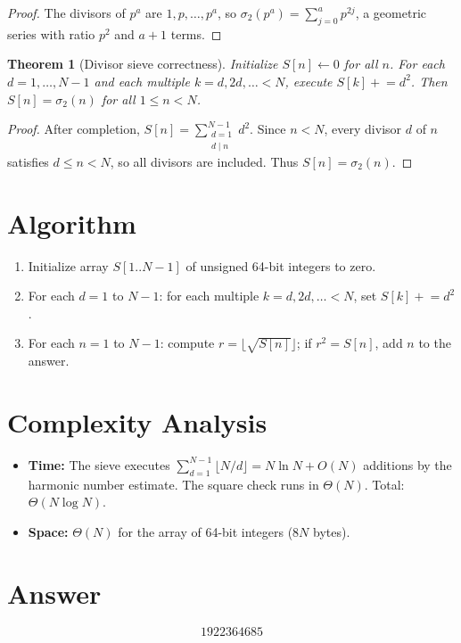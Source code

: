 \documentclass[12pt]{article}
\newtheorem{theorem}{Theorem}
\theoremstyle{definition}
\begin{document}
\begin{proof}
The divisors of $p^a$ are $1, p, \ldots, p^a$, so $\sigma_2(p^a) = \sum_{j=0}^{a} p^{2j}$, a geometric series with ratio $p^2$ and $a+1$ terms.
\end{proof}

\begin{theorem}[Divisor sieve correctness]
Initialize $S[n] \leftarrow 0$ for all $n$. For each $d = 1, \ldots, N{-}1$ and each multiple $k = d, 2d, \ldots < N$, execute $S[k] \mathrel{+}= d^2$. Then $S[n] = \sigma_2(n)$ for all $1 \leq n < N$.
\end{theorem}

\begin{proof}
After completion, $S[n] = \sum_{\substack{d=1 \\ d \mid n}}^{N-1} d^2$. Since $n < N$, every divisor $d$ of $n$ satisfies $d \leq n < N$, so all divisors are included. Thus $S[n] = \sigma_2(n)$.
\end{proof}

\section{Algorithm}

\begin{enumerate}
\item Initialize array $S[1..N{-}1]$ of unsigned 64-bit integers to zero.
\item For each $d = 1$ to $N{-}1$: for each multiple $k = d, 2d, \ldots < N$, set $S[k] \mathrel{+}= d^2$.
\item For each $n = 1$ to $N{-}1$: compute $r = \lfloor\sqrt{S[n]}\rfloor$; if $r^2 = S[n]$, add $n$ to the answer.
\end{enumerate}

\section{Complexity Analysis}

\begin{itemize}
\item \textbf{Time:} The sieve executes $\sum_{d=1}^{N-1}\lfloor N/d\rfloor = N\ln N + O(N)$ additions by the harmonic number estimate. The square check runs in $\Theta(N)$. Total: $\Theta(N\log N)$.
\item \textbf{Space:} $\Theta(N)$ for the array of 64-bit integers ($8N$ bytes).
\end{itemize}

\section{Answer}

\[
\boxed{1922364685}
\]
\end{document}
